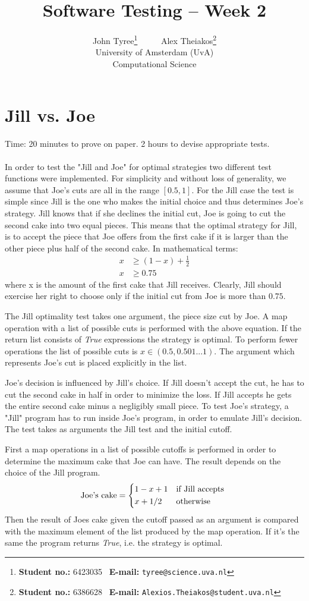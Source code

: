 \documentclass[11pt,a4paper]{article}
\title{\large \textbf{Software Testing} \--- Week 2}
\author{John Tyree\footnote{\textbf{Student no.:} 6423035 \textbar\ \textbf{E-mail:} \texttt{tyree@science.uva.nl}} \ \ \ \ \ Alex Theiakos\footnote{\textbf{Student no.:} 6386628 \textbar\ \textbf{E-mail:} \texttt{Alexios.Theiakos@student.uva.nl}} \\[15pt] University of Amsterdam (UvA) \\ Computational Science}
\date{}
\numberwithin{equation}{section}%
\begin{document}
\maketitle

\section{Jill vs. Joe}
Time: 20 minutes to prove on paper. 2 hours to devise appropriate tests. \\ \\
In order to test the "Jill and Joe" for optimal strategies two different test functions were implemented. For simplicity and without loss of generality, we assume that Joe's cuts are all in the range $[0.5, 1]$.
For the Jill case the test is simple since Jill is the one who makes the initial choice and thus determines Joe's strategy. Jill knows that if she declines the initial cut, Joe is going to cut the second cake into two equal pieces.
This means that the optimal strategy for Jill, is to accept the piece that Joe offers from the first cake if it is larger than the other piece plus half of the second cake. In mathematical terms:
\begin{align*}
    x &\geq (1 - x) + \frac{1}{2} \\
    x &\geq 0.75
\end{align*}
where x is the amount of the first cake that Jill receives.
Clearly, Jill should exercise her right to choose only if the initial cut from Joe is more than $0.75$.

The Jill optimality test takes one argument, the piece size cut by Joe. A map operation with a list of possible cuts is performed with the above equation. If the return list consists of \emph{True} expressions the strategy is optimal. To perform fewer operations the list of possible cuts is $x\in (0.5,0.501...1)$. The argument which represents Joe's cut is placed explicitly in the list.

Joe's decision is influenced by Jill's choice. If Jill doesn't accept the cut, he has to cut the second cake in half in order to minimize the loss. If Jill accepts he gets the entire second cake minus a negligibly small piece.
To test Joe's strategy, a "Jill" program has to run inside Joe's program, in order to emulate Jill's decision. The test takes as arguments the Jill test and the initial cutoff. 

First a map operations in a list of possible cutoffs is performed in order to determine the maximum cake that Joe can have. The result depends on the choice of the Jill program.
\[
    \text{Joe's cake} =
    \begin{dcases*}
        1 - x + 1 & if Jill accepts \\
        x + 1/2 & otherwise
    \end{dcases*}
\]
Then the result of Joes cake given the cutoff passed as an argument is compared with the maximum element of the list produced by the map operation. If it's the same the program returns \emph{True}, i.e. the strategy is optimal.
\end{document}
